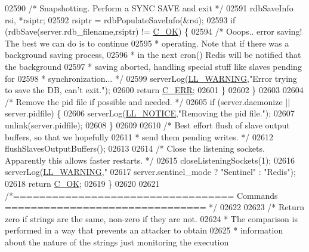 \begin{DoxyCode}
{{{{{{{{{{{{{{{{{{{{{{{{{{{{{{{{02590         \textcolor{comment}{/* Snapshotting. Perform a SYNC SAVE and exit */}
02591         rdbSaveInfo rsi, *rsiptr;
02592         rsiptr = rdbPopulateSaveInfo(&rsi);
02593         \textcolor{keywordflow}{if} (rdbSave(server.rdb\_filename,rsiptr) != \hyperlink{server_8h_a303769ef1065076e68731584e758d3e1}{C\_OK}) \{
02594             \textcolor{comment}{/* Ooops.. error saving! The best we can do is to continue}
02595 \textcolor{comment}{             * operating. Note that if there was a background saving process,}
02596 \textcolor{comment}{             * in the next cron() Redis will be notified that the background}
02597 \textcolor{comment}{             * saving aborted, handling special stuff like slaves pending for}
02598 \textcolor{comment}{             * synchronization... */}
02599             serverLog(\hyperlink{server_8h_a31229b9334bba7d6be2a72970967a14b}{LL\_WARNING},\textcolor{stringliteral}{"Error trying to save the DB, can't exit."});
02600             \textcolor{keywordflow}{return} \hyperlink{server_8h_af98ac28d5f4d23d7ed5985188e6fb7d1}{C\_ERR};
02601         \}
02602     \}
02603 
02604     \textcolor{comment}{/* Remove the pid file if possible and needed. */}
02605     \textcolor{keywordflow}{if} (server.daemonize || server.pidfile) \{
02606         serverLog(\hyperlink{server_8h_a8c54c191e436c7dd3012167212692401}{LL\_NOTICE},\textcolor{stringliteral}{"Removing the pid file."});
02607         unlink(server.pidfile);
02608     \}
02609 
02610     \textcolor{comment}{/* Best effort flush of slave output buffers, so that we hopefully}
02611 \textcolor{comment}{     * send them pending writes. */}
02612     flushSlavesOutputBuffers();
02613 
02614     \textcolor{comment}{/* Close the listening sockets. Apparently this allows faster restarts. */}
02615     closeListeningSockets(1);
02616     serverLog(\hyperlink{server_8h_a31229b9334bba7d6be2a72970967a14b}{LL\_WARNING},\textcolor{stringliteral}{"%
02617         server.sentinel\_mode ? \textcolor{stringliteral}{"Sentinel"} : \textcolor{stringliteral}{"Redis"});
02618     \textcolor{keywordflow}{return} \hyperlink{server_8h_a303769ef1065076e68731584e758d3e1}{C\_OK};
02619 \}
02620 
02621 \textcolor{comment}{/*================================== Commands =============================== */}
02622 
02623 \textcolor{comment}{/* Return zero if strings are the same, non-zero if they are not.}
02624 \textcolor{comment}{ * The comparison is performed in a way that prevents an attacker to obtain}
02625 \textcolor{comment}{ * information about the nature of the strings just monitoring the execution}
}}}}}}}}}}}}}}}}}}}}}}}}}}}}}}}}}
\end{DoxyCode}
